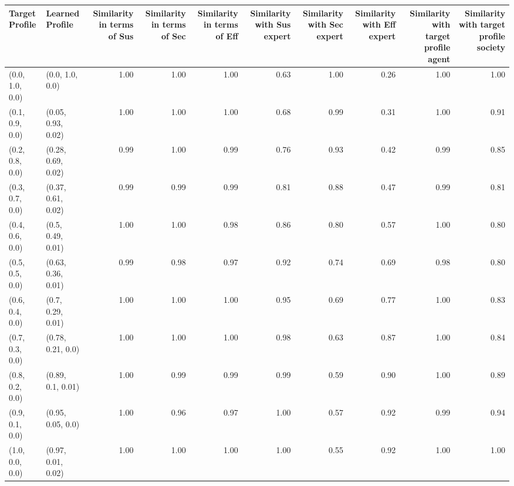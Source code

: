 \begin{tabular}{llrrrrrrrr}
\toprule
Target Profile & Learned Profile & Similarity in terms of Sus & Similarity in terms of Sec & Similarity in terms of Eff & Similarity with Sus expert & Similarity with Sec expert & Similarity with Eff expert & Similarity with target profile agent & Similarity with target profile society \\
\midrule
(0.0, 1.0, 0.0) & (0.0, 1.0, 0.0) & 1.00 & 1.00 & 1.00 & 0.63 & 1.00 & 0.26 & 1.00 & 1.00 \\
(0.1, 0.9, 0.0) & (0.05, 0.93, 0.02) & 1.00 & 1.00 & 1.00 & 0.68 & 0.99 & 0.31 & 1.00 & 0.91 \\
(0.2, 0.8, 0.0) & (0.28, 0.69, 0.02) & 0.99 & 1.00 & 0.99 & 0.76 & 0.93 & 0.42 & 0.99 & 0.85 \\
(0.3, 0.7, 0.0) & (0.37, 0.61, 0.02) & 0.99 & 0.99 & 0.99 & 0.81 & 0.88 & 0.47 & 0.99 & 0.81 \\
(0.4, 0.6, 0.0) & (0.5, 0.49, 0.01) & 1.00 & 1.00 & 0.98 & 0.86 & 0.80 & 0.57 & 1.00 & 0.80 \\
(0.5, 0.5, 0.0) & (0.63, 0.36, 0.01) & 0.99 & 0.98 & 0.97 & 0.92 & 0.74 & 0.69 & 0.98 & 0.80 \\
(0.6, 0.4, 0.0) & (0.7, 0.29, 0.01) & 1.00 & 1.00 & 1.00 & 0.95 & 0.69 & 0.77 & 1.00 & 0.83 \\
(0.7, 0.3, 0.0) & (0.78, 0.21, 0.0) & 1.00 & 1.00 & 1.00 & 0.98 & 0.63 & 0.87 & 1.00 & 0.84 \\
(0.8, 0.2, 0.0) & (0.89, 0.1, 0.01) & 1.00 & 0.99 & 0.99 & 0.99 & 0.59 & 0.90 & 1.00 & 0.89 \\
(0.9, 0.1, 0.0) & (0.95, 0.05, 0.0) & 1.00 & 0.96 & 0.97 & 1.00 & 0.57 & 0.92 & 0.99 & 0.94 \\
(1.0, 0.0, 0.0) & (0.97, 0.01, 0.02) & 1.00 & 1.00 & 1.00 & 1.00 & 0.55 & 0.92 & 1.00 & 1.00 \\
\bottomrule
\end{tabular}
